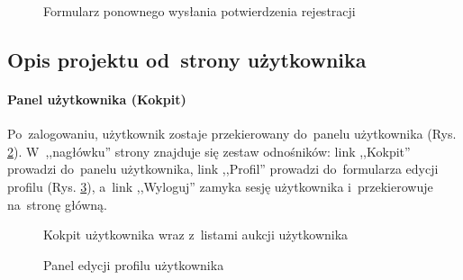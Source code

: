 \begin{figure}[h]
\centering
{}
\caption{Formularz ponownego wysłania potwierdzenia rejestracji}
\label{screen12}
\end{figure}

\subsection{Opis projektu od~strony użytkownika} \label{man.user}

\paragraph{Panel użytkownika (Kokpit)}

Po~zalogowaniu, użytkownik zostaje przekierowany do~panelu użytkownika (Rys. \ref{screen04}). W~,,nagłówku'' strony znajduje się zestaw odnośników: link ,,Kokpit'' prowadzi do~panelu użytkownika, link ,,Profil'' prowadzi do~formularza edycji profilu (Rys. \ref{screen07}), a~link ,,Wyloguj'' zamyka sesję użytkownika i~przekierowuje na~stronę główną.

\begin{figure}[h]
\centering
{}
\caption{Kokpit użytkownika wraz z~listami aukcji użytkownika}
\label{screen04}
\end{figure}

\begin{figure}[h]
\centering
{}
\caption{Panel edycji profilu użytkownika}
\label{screen07}
\end{figure}

